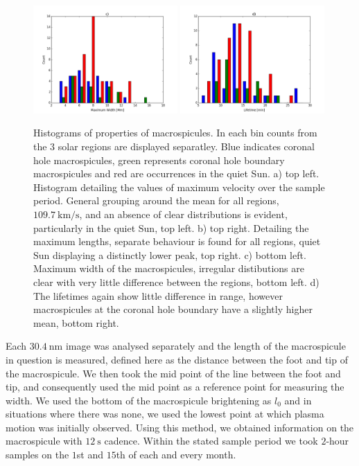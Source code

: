 \begin{figure}[t!]
	\includegraphics[width=0.49\textwidth, height=0.24\textheight]{Chapter3/Figs/width_hist.pdf}
	\includegraphics[width=0.49\textwidth, height=0.24\textheight]{Chapter3/Figs/lt_hist.pdf}	
	\caption{\small Histograms of properties of macrospicules. In each bin counts from the 3 solar regions are displayed separatley. Blue indicates coronal hole macrospicules, green represents coronal hole boundary macrospicules and red are occurrences in the quiet Sun. a) top left. Histogram detailing the values of maximum velocity over the sample period. General grouping around the mean for all regions, $109.7\ \textrm{km/s}$, and an absence of clear distributions is evident, particularly in the quiet Sun, top left. b) top right. Detailing the maximum lengths, separate behaviour is found for all regions, quiet Sun displaying a distinctly lower peak, top right. c) bottom left. Maximum width of the macrospicules, irregular distibutions are clear with very little difference between the regions, bottom left. d) The lifetimes again show little difference in range, however macrospicules at the coronal hole boundary have a slightly higher mean, bottom right.}
	\label{fig:basic-prop}
\end{figure}


Each $30.4\ \textrm{nm}$ image was analysed separately and the length of the macrospicule in question is measured, defined here as the distance between the foot and tip of the macrospicule. We then took the mid point of the line between the foot and tip, and consequently used the mid point as a reference point for measuring the width. We used the bottom of the macrospicule brightening as $l_0$ and in situations where there was none, we used the lowest point at which plasma motion was initially observed. Using this method, we obtained information on the macrospicule with $12\ \textrm{s}$ cadence. Within the stated sample period we took $2$-hour samples on the $1$st and $15$th of each and every month.

